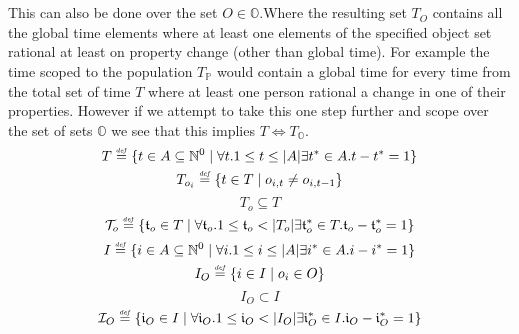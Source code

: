\documentclass[]{article}
\newcommand{\defeq}{\stackrel{\smash{\scriptscriptstyle\mathit{def}}}{=}}
\begin{document}
\\
\\
This can also be done over the set $O \in \mathbb{O}$.Where the resulting set $T_{O}$ contains all the global time elements where at least one elements of the specified object set rational at least on property change (other than global time). For example the time scoped to the population $T_{\mathbb{P}}$ would contain a global time for every time from the total set of time $T$ where at least one person rational a change in one of their properties. However if we attempt to take this one step further and scope over the set of sets $\mathbb{O}$ we see that this implies $T \Longleftrightarrow T_{\mathbb{O}}$. 
\begin{equation} \label{eq:global_times} 
T \defeq \{ t \in A \subseteq \mathbb{N}^{0} \mid \forall t.1 \leq t \leq |A|\exists t^{*} \in A.t-t^{*}=1 \} 
\end{equation}
\begin{equation} \label{eq:object_element_times}
T_{o_{i}} \defeq \{ t \in T \mid o_{i, t} \ne o_{i, t-1} \}
\end{equation}
\begin{equation} \label{eq:subset_global_times}
T_{o} \subseteq T
\end{equation}
\begin{equation} \label{eq:relative_object_times} 
\mathcal{T}_{o} \defeq \{ \mathfrak{t}_{o} \in T \mid \forall \mathfrak{t}_{o}.1 \leq \mathfrak{t}_{o}  < |T_{o}| \exists \mathfrak{t}^{*}_{o} \in T.\mathfrak{t}_{o}-\mathfrak{t}^{*}_{o}=1 \} 
\end{equation}
%
\begin{equation} \label {eq:global_identities}
I \defeq \{ i \in A \subseteq \mathbb{N}^{0} \mid \forall i.1 \leq i \leq |A|\exists i^{*} \in A.i-i^{*}=1 \}
\end{equation}
\begin{equation} \label {eq:object_identities}
I_{O} \defeq \{ i \in I \mid o_{i} \in O \}
\end{equation}
\begin{equation} \label {eq:subset_global_identities}
I_{O} \subset I
\end{equation}
\begin{equation} \label{eq:relative_object_identities}
\mathcal{I}_{O} \defeq \{ \mathfrak{i}_{O} \in I \mid \forall \mathfrak{i}_{O}.1 \leq \mathfrak{i}_{O} < |I_{O}| \exists \mathfrak{i}^{*}_{O} \in I.\mathfrak{i}_{O}-\mathfrak{i}^{*}_{O}=1 \} 
\end{equation}
%
\end{document}
